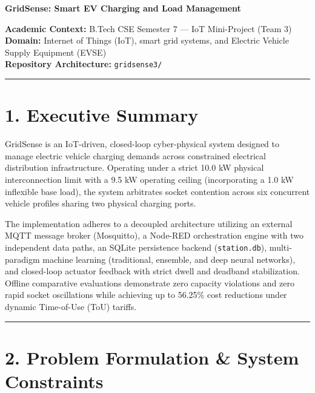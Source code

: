 \documentclass[
]{article}
\author{}
\date{}
\begin{document}
\begin{center}
\parbox{\textwidth}{\centering\LARGE\bfseries\color{gridsenseblue}
GridSense: Smart EV Charging and Load Management\par}
\vspace{0.6em}
\end{center}
\label{gridsense-smart-ev-charging-and-load-management}

\textbf{Academic Context:} B.Tech CSE Semester 7 --- IoT Mini-Project
(Team 3)\\
\textbf{Domain:} Internet of Things (IoT), smart grid systems, and
Electric Vehicle Supply Equipment (EVSE)\\
\textbf{Repository Architecture:} \texttt{gridsense3/}

\vspace{0.5em}\noindent\color{gridsenseblue}\rule{\linewidth}{0.6pt}\color{black}\vspace{0.5em}

\section{1. Executive Summary}\label{executive-summary}

GridSense is an IoT-driven, closed-loop cyber-physical system designed
to manage electric vehicle charging demands across constrained
electrical distribution infrastructure. Operating under a strict 10.0 kW
physical interconnection limit with a 9.5 kW operating ceiling
(incorporating a 1.0 kW inflexible base load), the system arbitrates
socket contention across six concurrent vehicle profiles sharing two
physical charging ports.

The implementation adheres to a decoupled architecture utilizing an
external MQTT message broker (Mosquitto), a Node-RED orchestration
engine with two independent data paths, an SQLite persistence backend
(\texttt{station.db}), multi-paradigm machine learning (traditional,
ensemble, and deep neural networks), and closed-loop actuator feedback
with strict dwell and deadband stabilization. Offline comparative
evaluations demonstrate zero capacity violations and zero rapid socket
oscillations while achieving up to 56.25\% cost reductions under dynamic
Time-of-Use (ToU) tariffs.

\vspace{0.5em}\noindent\textcolor{gridsenseblue}{\rule{\linewidth}{0.6pt}}\vspace{0.5em}

\section{2. Problem Formulation \& System
Constraints}\label{problem-formulation-system-constraints}
\end{document}
